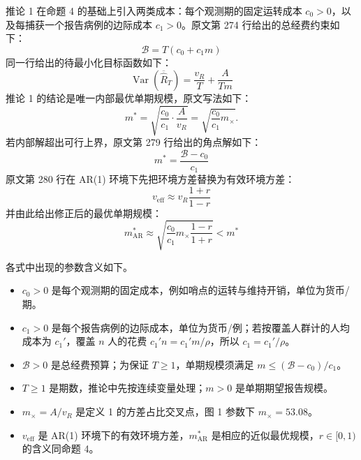 推论 1 在命题 4 的基础上引入两类成本：每个观测期的固定运转成本 $c_0>0$，以及每捕获一个报告病例的边际成本 $c_1>0$。原文第 274 行给出的总经费约束如下：
\begin{equation*}
\mathcal{B} = T(c_0 + c_1 m)
\tag*{原文第 274 行}
\end{equation*}
同一行给出的待最小化目标函数如下：
\begin{equation*}
\operatorname{Var}(\overline{\widehat{R}}_T) = \frac{v_R}{T} + \frac{A}{T m}
\tag*{原文第 274 行}
\end{equation*}
推论 1 的结论是唯一内部最优单期规模，原文写法如下：
\begin{equation*}
m^* = \sqrt{\frac{c_0}{c_1} \cdot \frac{A}{v_R}} = \sqrt{\frac{c_0}{c_1} m_\times}.
\tag{原文式 18}
\end{equation*}
若内部解超出可行上界，原文第 279 行给出的角点解如下：
\begin{equation*}
m^* = \frac{\mathcal{B} - c_0}{c_1}
\tag*{原文第 279 行}
\end{equation*}
原文第 280 行在 AR(1) 环境下先把环境方差替换为有效环境方差：
\begin{equation*}
v_{\mathrm{eff}} \approx v_R \frac{1+r}{1-r}
\tag*{原文第 280 行}
\end{equation*}
并由此给出修正后的最优单期规模：
\begin{equation*}
m^*_{\mathrm{AR}} \approx \sqrt{\frac{c_0}{c_1} m_\times \frac{1-r}{1+r}} < m^*
\tag*{原文第 280 行}
\end{equation*}

各式中出现的参数含义如下。
\begin{itemize}
\item $c_0>0$ 是每个观测期的固定成本，例如哨点的运转与维持开销，单位为货币/期。
\item $c_1>0$ 是每个报告病例的边际成本，单位为货币/例；若按覆盖人群计的人均成本为 $c_1'$，覆盖 $n$ 人的花费 $c_1'n=c_1'm/\rho$，所以 $c_1=c_1'/\rho$。
\item $\mathcal B>0$ 是总经费预算；为保证 $T\ge1$，单期规模须满足 $m\le(\mathcal B-c_0)/c_1$。
\item $T\ge1$ 是期数，推论中先按连续变量处理；$m>0$ 是单期期望报告规模。
\item $m_\times=A/v_R$ 是定义 1 的方差占比交叉点，图 1 参数下 $m_\times=53.08$。
\item $v_{\mathrm{eff}}$ 是 AR(1) 环境下的有效环境方差，$m^*_{\mathrm{AR}}$ 是相应的近似最优规模，$r\in[0,1)$ 的含义同命题 4。
\end{itemize}

